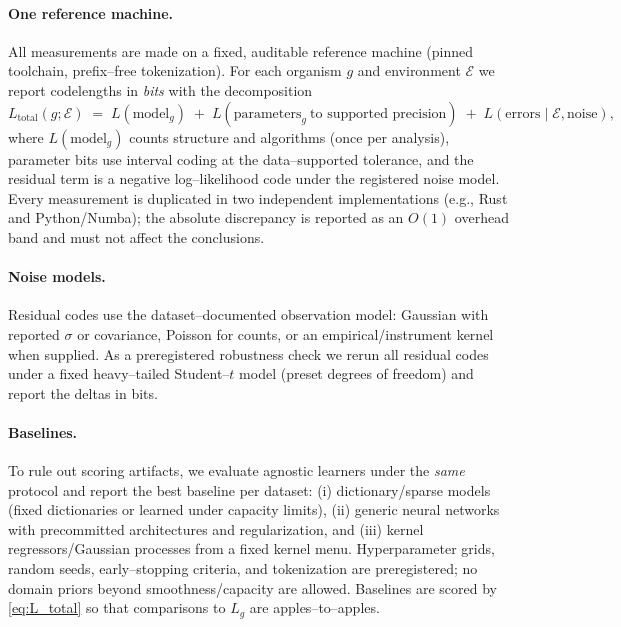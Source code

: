 \documentclass[11pt,a4paper]{article}
\begin{document}
\paragraph{One reference machine.}
All measurements are made on a fixed, auditable reference machine (pinned toolchain, prefix–free tokenization). For each organism $g$ and environment $\mathcal{E}$ we report codelengths in \emph{bits} with the decomposition
\begin{equation}\label{eq:L_total}
L_{\mathrm{total}}(g;\mathcal{E})
\;=\;
L(\text{model}_g)
\;+\;
L(\text{parameters}_g\ \text{to supported precision})
\;+\;
L(\text{errors}\mid \mathcal{E},\text{noise}),
\end{equation}
where $L(\text{model}_g)$ counts structure and algorithms (once per analysis), parameter bits use interval coding at the data–supported tolerance, and the residual term is a negative log–likelihood code under the registered noise model. Every measurement is duplicated in two independent implementations (e.g., Rust and Python/Numba); the absolute discrepancy is reported as an $O(1)$ overhead band and must not affect the conclusions.

\paragraph{Noise models.}
Residual codes use the dataset–documented observation model: Gaussian with reported $\sigma$ or covariance, Poisson for counts, or an empirical/instrument kernel when supplied. As a preregistered robustness check we rerun all residual codes under a fixed heavy–tailed Student–$t$ model (preset degrees of freedom) and report the deltas in bits.

\paragraph{Baselines.}
To rule out scoring artifacts, we evaluate agnostic learners under the \emph{same} protocol and report the best baseline per dataset: (i) dictionary/sparse models (fixed dictionaries or learned under capacity limits), (ii) generic neural networks with precommitted architectures and regularization, and (iii) kernel regressors/Gaussian processes from a fixed kernel menu. Hyperparameter grids, random seeds, early–stopping criteria, and tokenization are preregistered; no domain priors beyond smoothness/capacity are allowed. Baselines are scored by \eqref{eq:L_total} so that comparisons to $L_g$ are apples–to–apples.
\end{document}
